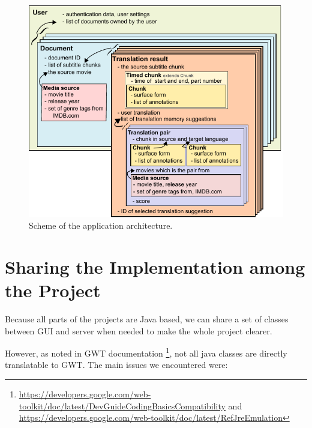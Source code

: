 \begin{figure}[h]
\begin{center}
\includegraphics{figures/shared_classes.pdf}
\end{center}
\caption{Scheme of the application architecture.}\label{projectStructure:logical}
\end{figure}


\section{Sharing the Implementation among the Project}

Because all parts of the projects are Java based, we can share a set of classes between GUI and server when needed to make the whole project clearer.

However, as noted in GWT documentation \footnote{\url{https://developers.google.com/web-toolkit/doc/latest/DevGuideCodingBasicsCompatibility} and \url{https://developers.google.com/web-toolkit/doc/latest/RefJreEmulation}}, not all java classes are directly translatable to GWT. The main issues we encountered were:

